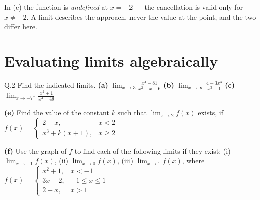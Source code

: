 \begin{pitfall}
In (c) the function is \emph{undefined} at $x=-2$ --- the cancellation is valid
only for $x\neq-2$. A limit describes the approach, never the value at the
point, and the two differ here.
\end{pitfall}

\section{Evaluating limits algebraically}

\begin{question}{Q.2}
Find the indicated limits.
\textbf{(a)} $\displaystyle\lim_{x\to 3}\frac{x^{4}-81}{x^{2}-x-6}$ \quad
\textbf{(b)} $\displaystyle\lim_{x\to \infty}\frac{4-3x^{3}}{x^{3}-1}$ \quad
\textbf{(c)} $\displaystyle\lim_{x\to -7^{-}}\frac{x^{2}+1}{x^{2}-49}$

\smallskip
\textbf{(e)} Find the value of the constant $k$ such that
$\displaystyle\lim_{x\to 2}f(x)$ exists, if
$f(x)=\begin{cases} 2-x, & x<2\\ x^{3}+k(x+1), & x\ge 2\end{cases}$

\smallskip
\textbf{(f)} Use the graph of $f$ to find each of the following limits if they
exist: (i) $\lim_{x\to-1}f(x)$, (ii) $\lim_{x\to 0}f(x)$,
(iii) $\lim_{x\to 1}f(x)$, where
$f(x)=\begin{cases} x^{2}+1, & x<-1\\ 3x+2, & -1\le x\le 1\\ 2-x, & x>1\end{cases}$
\end{question}


